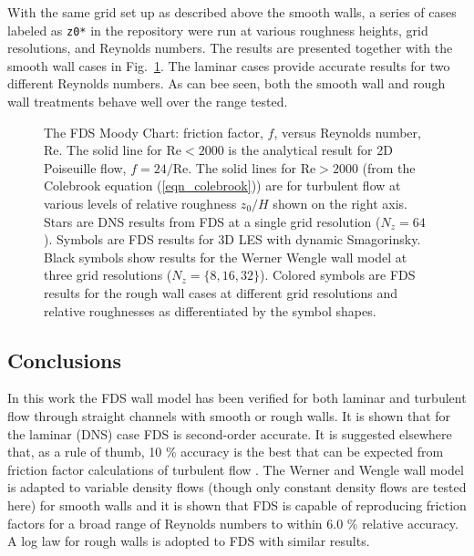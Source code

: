 \documentclass[11pt]{book}
\begin{document}
With the same grid set up as described above the smooth walls, a series of cases labeled as {\tt z0*} in the repository were run at various roughness heights, grid resolutions, and Reynolds numbers.  The results are presented together with the smooth wall cases in Fig.~\ref{fig_fds_moody_chart}.  The laminar cases provide accurate results for two different Reynolds numbers.  As can bee seen, both the smooth wall and rough wall treatments behave well over the range tested.
\begin{figure}
   \begin{center}
      \caption{\label{fig_fds_moody_chart} \small The FDS Moody Chart: friction factor, $f$, versus Reynolds number, Re. The solid line for $\mbox{Re} < 2000$ is the analytical result for 2D Poiseuille flow, $f=24/\mbox{Re}$. The solid lines for $\mbox{Re}>2000$ (from the Colebrook equation (\ref{eqn_colebrook})) are for turbulent flow at various levels of relative roughness $z_0/H$ shown on the right axis.  Stars are DNS results from FDS at a single grid resolution ($N_z=64$). Symbols are FDS results for 3D LES with dynamic Smagorinsky.  Black symbols show results for the Werner Wengle wall model at three grid resolutions ($N_z=\{8,16,32\}$).  Colored symbols are FDS results for the rough wall cases at different grid resolutions and relative roughnesses as differentiated by the symbol shapes.}
   \end{center}
\end{figure}

\subsection{Conclusions}
\label{conclusions}

In this work the FDS wall model has been verified for both laminar and turbulent flow through straight channels with smooth or rough walls.  It is shown that for the laminar (DNS) case FDS is second-order accurate.  It is suggested elsewhere that, as a rule of thumb, 10 \% accuracy is the best that can be expected from friction factor calculations of turbulent flow \cite{MYO}.  The Werner and Wengle wall model is adapted to variable density flows (though only constant density flows are tested here) for smooth walls and it is shown that FDS is capable of reproducing friction factors for a broad range of Reynolds numbers to within 6.0 \% relative accuracy.  A log law for rough walls is adopted to FDS with similar results.
\end{document}
